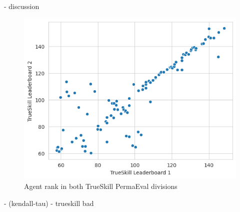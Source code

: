 \begin{code}
    - discussion
\end{code}
\begin{figure}[H]
\centering
    \includegraphics[width=0.8\linewidth]{Results/figures/trueskill_comparison.png}
\caption{Agent rank in both TrueSkill PermaEval divisions}
\label{TrueSkillCompare2}
\end{figure}
\begin{code}
    - (kendall-tau)
    - trueskill bad
\end{code}

